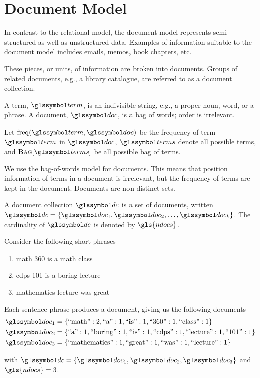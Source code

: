 \section{Document Model}
\label{sec:document-model}
	In contrast to the relational model, the document model represents semi-structured as well as unstructured data.  Examples of information suitable to the document model includes emails, memos, book chapters, etc.
	
	These pieces, or units, of information are broken into documents.  Groups of related documents, e.g., a library catalogue, are referred to as a document collection.

	\begin{defn}
	\label{def:document}
		A term, \(\term\), is an indivisible string, e.g., a proper noun, word, or a phrase.	A document, \(\doc\), is a bag of words; order is irrelevant.
		
		Let \(\freq(\term, \doc)\) be the frequency of term \(\term\) in \(\doc\), \(\terms\) denote all possible terms, and \(\bag{\terms}\) be all possible bag of terms.
	\end{defn}
	
	\begin{remark}
		We use the bag-of-words model for documents.  This means that position information of terms in a document is irrelevant, but the frequency of terms are kept in the document.  Documents are non-distinct sets.
	\end{remark}
	
	\begin{defn}
	\label{def:document-collection}
		A document collection \(\dc\) is a set of documents, written \(\dc = \{\doc_1, \doc_2, \dotsc, \doc_k\}\).  The cardinality of \(\dc\) is denoted by \(\gls{ndocs}\).
	\end{defn}
	
	\begin{ex}
	\label{ex:documents}
		Consider the following short phrases
		
		\begin{enumerate}
			\item math 360 is a math class
			\item cdps 101 is a boring lecture
			\item mathematics lecture was great
		\end{enumerate}
		
		Each sentence phrase produces a document, giving us the following documents
		\begin{align}
			\doc_1 &= \{\text{``math''}: 2, \text{``a''}: 1, \text{``is''}: 1, \text{``360''}: 1, \text{``class''}: 1\} \\
			\doc_2 &= \{\text{``a''}: 1, \text{``boring''}: 1, \text{``is''}: 1, \text{``cdps''}: 1, \text{``lecture''}: 1, \text{``101''}: 1\} \\
			\doc_3 &= \{\text{``mathematics''}: 1, \text{``great''}: 1, \text{``was''}: 1, \text{``lecture''}: 1\}
		\end{align}
		
		with \(\dc = \{\doc_1, \doc_2, \doc_3\}\) and \(\gls{ndocs} = 3\).
	\end{ex}
	
